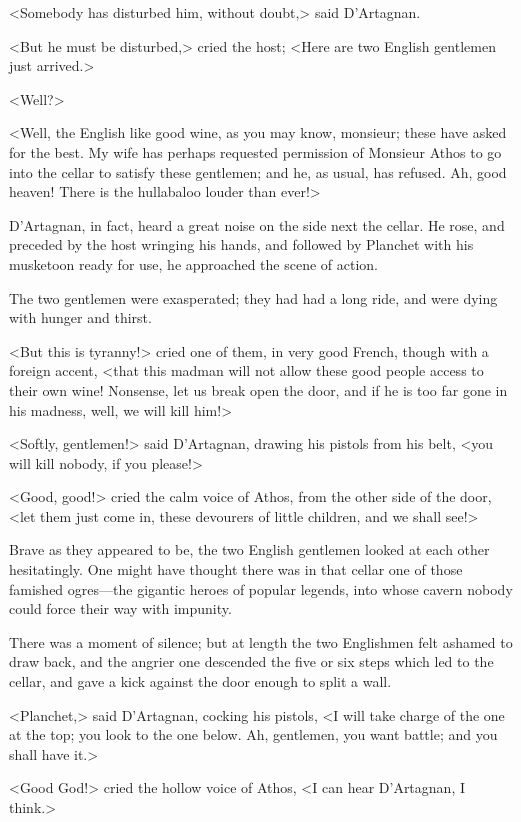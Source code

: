 <Somebody has disturbed him, without doubt,> said D'Artagnan. 

<But he must be disturbed,> cried the host; <Here are two English gentlemen just arrived.> 

<Well?> 

<Well, the English like good wine, as you may know, monsieur; these have asked for the best. My wife has perhaps requested permission of Monsieur Athos to go into the cellar to satisfy these gentlemen; and he, as usual, has refused. Ah, good heaven! There is the hullabaloo louder than ever!> 

D'Artagnan, in fact, heard a great noise on the side next the cellar. He rose, and preceded by the host wringing his hands, and followed by Planchet with his musketoon ready for use, he approached the scene of action. 

The two gentlemen were exasperated; they had had a long ride, and were dying with hunger and thirst. 

<But this is tyranny!> cried one of them, in very good French, though with a foreign accent, <that this madman will not allow these good people access to their own wine! Nonsense, let us break open the door, and if he is too far gone in his madness, well, we will kill him!> 

<Softly, gentlemen!> said D'Artagnan, drawing his pistols from his belt, <you will kill nobody, if you please!> 

<Good, good!> cried the calm voice of Athos, from the other side of the door, <let them just come in, these devourers of little children, and we shall see!> 

Brave as they appeared to be, the two English gentlemen looked at each other hesitatingly. One might have thought there was in that cellar one of those famished ogres—the gigantic heroes of popular legends, into whose cavern nobody could force their way with impunity. 

There was a moment of silence; but at length the two Englishmen felt ashamed to draw back, and the angrier one descended the five or six steps which led to the cellar, and gave a kick against the door enough to split a wall. 

<Planchet,> said D'Artagnan, cocking his pistols, <I will take charge of the one at the top; you look to the one below. Ah, gentlemen, you want battle; and you shall have it.> 

<Good God!> cried the hollow voice of Athos, <I can hear D'Artagnan, I think.> 

